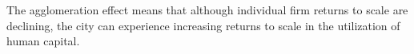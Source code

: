 The \gls{agglomeration effect} means that although individual firm returns to scale are declining, the city can experience \gls{increasing returns to scale} in the utilization of human capital. %





